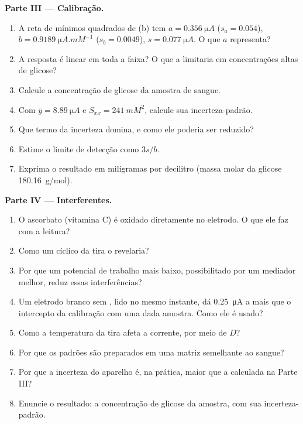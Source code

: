 \begin{problem}
\medskip\noindent\textbf{Parte III --- Calibração.}
\begin{enumerate}[resume]
  \item A reta de mínimos quadrados de (b) tem $a = \qty{0.356}{\micro A}$ ($s_a = 0.054$), $b =
        \qty{0.9189}{\micro A.mM^{-1}}$ ($s_b = 0.0049$), $s = \qty{0.077}{\micro A}$. O que $a$ representa?
  \item A resposta é linear em toda a faixa? O que a limitaria em concentrações altas
        de glicose?
  \item Calcule a concentração de glicose da amostra de sangue.
  \item Com $\bar y = \qty{8.89}{\micro A}$ e $S_{xx} = \qty{241}{mM^2}$, calcule sua incerteza-padrão.
  \item Que termo da incerteza domina, e como ele poderia ser reduzido?
  \item Estime o limite de detecção como $3s/b$.
  \item Exprima o resultado em miligramas por decilitro (massa molar da glicose
        \qty{180.16}{g/mol}).
\end{enumerate}

\medskip\noindent\textbf{Parte IV --- Interferentes.}
\begin{enumerate}[resume]
  \item O ascorbato (vitamina C) é oxidado diretamente no eletrodo. O que ele faz
        com a leitura?
  \item Como um  cíclico da tira o revelaria?
  \item Por que um potencial de trabalho mais baixo, possibilitado por um mediador
        melhor, reduz essas interferências?
  \item Um eletrodo branco sem , lido no mesmo instante, dá \qty{0.25}{\micro A}
        a mais que o intercepto da calibração com uma dada amostra. Como ele é usado?
  \item Como a temperatura da tira afeta a corrente, por meio de $D$?
  \item Por que os padrões são preparados em uma matriz semelhante ao sangue?
  \item Por que a incerteza do aparelho é, na prática, maior que a calculada na
        Parte III?
  \item Enuncie o resultado: a concentração de glicose da amostra, com sua
        incerteza-padrão.
\end{enumerate}
\end{problem}
